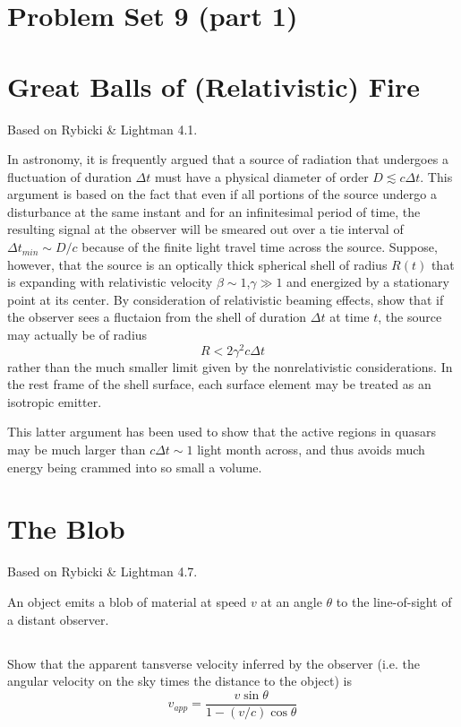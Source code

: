 \documentclass[11pt]{article}
\begin{document}
\pagestyle{empty}

\section*{\centering Problem Set 9 (part 1)}

\section{Great Balls of (Relativistic) Fire}

Based on Rybicki \& Lightman 4.1.

In astronomy, it is frequently argued that a source of radiation that
undergoes a fluctuation of duration $\Delta t$ must have a physical
diameter of order $D\lesssim c\Delta t$.  This argument is based on the 
fact that even if all portions of the source undergo a disturbance at the same instant
and for an infinitesimal period of time, the resulting signal at the
observer will be smeared out over a tie interval of $\Delta t_{min}\sim D/c$
because of the finite light travel time across the source.  Suppose, however,
that the source is an optically thick spherical shell of radius $R(t)$ that
is expanding with relativistic velocity $\beta\sim1$,$\gamma\gg1$ and energized
by a stationary point at its center.  
By consideration of relativistic beaming effects,
show that if the observer sees a fluctaion from the shell of duration $\Delta t$
at time $t$, the source may actually be of radius
\begin{equation}
R<2\gamma^2c\Delta t
\end{equation}
rather than the much smaller limit given by the nonrelativistic considerations.
In the rest frame of the shell surface, each surface element may be treated
as an isotropic emitter.

This latter argument has been used to show that the active regions
in quasars may be much larger than $c\Delta t\sim1$ light month across,
and thus avoids much energy being crammed into so small a volume.

\section{The Blob}

Based on Rybicki \& Lightman 4.7.

An object emits a blob of material at speed $v$ at an angle $\theta$ to
the line-of-sight of a distant observer.

\subsection{}
Show that the apparent tansverse velocity inferred by the observer
(i.e. the angular velocity on the sky times the distance to the object) is
\begin{equation}
v_{app}=\frac{v\sin\theta}{1-(v/c)\cos\theta}
\end{equation}
\end{document}
